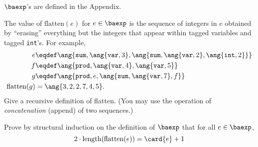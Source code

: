 \documentclass[handout]{mcs}
\begin{document}
\begin{problem}

$\baexp$'s are defined in the Appendix.

\bparts

\ppart The value of $\text{flatten}(e)$ for $e \in \baexp$ is the 
sequence
of integers in $e$ obtained by ``erasing'' everything but the integers
that appear within tagged variables and tagged \texttt{int}'s.  For
example,
\begin{align*}
e & \eqdef \ang{\texttt{sum}, \ang{\texttt{var},
3}, \ang{\texttt{sum}, \ang{\texttt{var}, 2},\ang{\texttt{int}, 2}}}\\
f & \eqdef \ang{\texttt{prod}, \ang{\texttt{var},4},\ang{\texttt{var}, 
5}}\\
g & \eqdef \ang{\texttt{prod}, e,  \ang{\texttt{sum}, 
\ang{\texttt{var},7}, f}}\\
\text{flatten}(g) & = \ang{3,2,2,7,4,5}.
\end{align*}
Give a recursive definition of flatten.  (You may use the operation of
\emph{concatenation} (append) of two sequences.)


\ppart Prove by structural induction on the definition of $\baexp$
that for all $e \in \baexp$,
\[
2\cdot \text{length}(\text{flatten}(e)) = \card{e}+1
\]


\end{problem}
\end{document}
